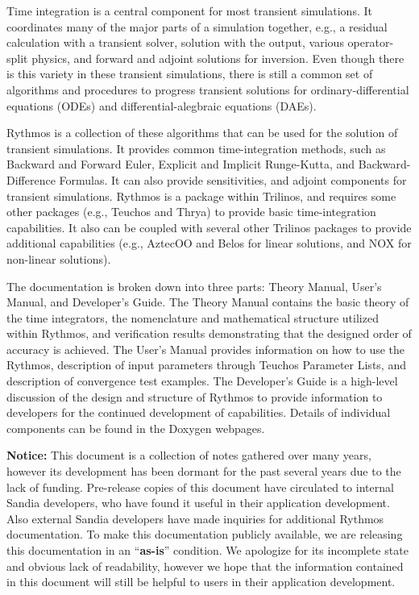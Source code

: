 Time integration is a central component for most transient simulations.
It coordinates many of the major parts of a simulation together, e.g.,
a residual calculation with a transient solver, solution with the
output, various operator-split physics, and forward and adjoint solutions
for inversion. Even though there is this variety in these transient
simulations, there is still a common set of algorithms and procedures
to progress transient solutions for ordinary-differential equations
(ODEs) and differential-alegbraic equations (DAEs). 

Rythmos is a collection of these algorithms that can be used for the
solution of transient simulations. It provides common time-integration
methods, such as Backward and Forward Euler, Explicit and Implicit
Runge-Kutta, and Backward-Difference Formulas. It can also provide
sensitivities, and adjoint components for transient simulations. Rythmos
is a package within Trilinos, and requires some other packages (e.g.,
Teuchos and Thrya) to provide basic time-integration capabilities.
It also can be coupled with several other Trilinos packages to provide
additional capabilities (e.g., AztecOO and Belos for linear solutions,
and NOX for non-linear solutions).

The documentation is broken down into three parts: Theory Manual,
User's Manual, and Developer's Guide. The Theory Manual contains the
basic theory of the time integrators, the nomenclature and mathematical
structure utilized within Rythmos, and verification results demonstrating
that the designed order of accuracy is achieved. The User's Manual
provides information on how to use the Rythmos, description of input
parameters through Teuchos Parameter Lists, and description of convergence
test examples. The Developer's Guide is a high-level discussion of
the design and structure of Rythmos to provide information to developers
for the continued development of capabilities. Details of individual
components can be found in the Doxygen webpages.

\textbf{Notice:} This document is a collection of notes gathered over
many years, however its development has been dormant for the past
several years due to the lack of funding. Pre-release copies of this
document have circulated to internal Sandia developers, who have found
it useful in their application development. Also external Sandia developers
have made inquiries for additional Rythmos documentation. To make
this documentation publicly available, we are releasing this documentation
in an ``\textbf{as-is}'' condition. We apologize for its incomplete
state and obvious lack of readability, however we hope that the information
contained in this document will still be helpful to users in their
application development.
